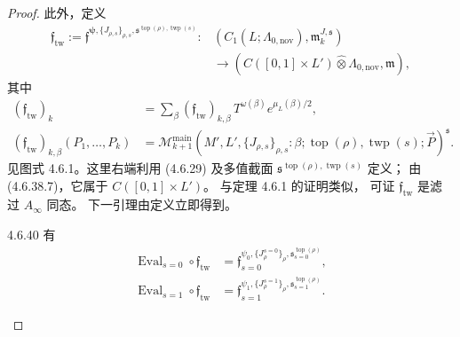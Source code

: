 \begin{proof}
此外，定义
\[
\begin{aligned}
\mathfrak f_{\mathrm{tw}}
:=
\mathfrak f^{\boldsymbol\psi,
\{J_{\rho,s}\}_{\rho,s},
\mathfrak s^{\operatorname{top}(\rho),
\operatorname{twp}(s)}}
\colon
&(C_1(L;\Lambda_{0,\mathrm{nov}}),
  \mathfrak m_k^{J,\mathfrak s})\\
&\longrightarrow
(C([0,1]\times L')
\widehat{\otimes}\Lambda_{0,\mathrm{nov}},
  \mathfrak m),
\end{aligned}
\]
其中
\[
\begin{aligned}
(\mathfrak f_{\mathrm{tw}})_k
&=\sum_\beta
  (\mathfrak f_{\mathrm{tw}})_{k,\beta}\,
  T^{\omega(\beta)}e^{\mu_L(\beta)/2},\\
(\mathfrak f_{\mathrm{tw}})_{k,\beta}
(P_1,\ldots,P_k)
&=
\mathcal M_{k+1}^{\mathrm{main}}
(M',L',\{J_{\rho,s}\}_{\rho,s}:
\beta;\operatorname{top}(\rho),
\operatorname{twp}(s);\vec P)^{\mathfrak s}.
\end{aligned}
\]
见图式 4.6.1。这里右端利用 (4.6.29)
及多值截面
$\mathfrak s^{\operatorname{top}(\rho),
\operatorname{twp}(s)}$ 定义；
由 (4.6.38.7)，它属于
$C([0,1]\times L')$。
与定理 4.6.1 的证明类似，
可证 $\mathfrak f_{\mathrm{tw}}$
是滤过 $A_\infty$ 同态。
下一引理由定义立即得到。

\begin{lemma}{4.6.40}\label{lem:4-6-40}
有
\begin{align}
\operatorname{Eval}_{s=0}\circ
\mathfrak f_{\mathrm{tw}}
&=
\mathfrak f_{s=0}^{\psi_0,
\{J_\rho^{s=0}\}_\rho,
\mathfrak s^{\operatorname{top}(\rho)}_{s=0}},
\tag{4.6.41.1}\label{eq:4-6-41-1}\\
\operatorname{Eval}_{s=1}\circ
\mathfrak f_{\mathrm{tw}}
&=
\mathfrak f_{s=1}^{\psi_1,
\{J_\rho^{s=1}\}_\rho,
\mathfrak s^{\operatorname{top}(\rho)}_{s=1}}.
\tag{4.6.41.2}\label{eq:4-6-41-2}
\end{align}
\end{lemma}


\end{proof}
